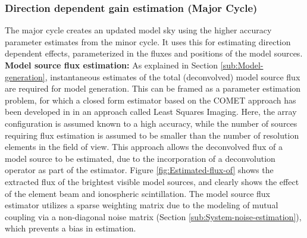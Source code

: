 \documentclass{aa}
\begin{document}
\subsubsection{\label{sub:Direction-dependent-gain}Direction dependent gain estimation
(Major Cycle)}  The major cycle  creates an updated  model sky using  the higher
accuracy parameter estimates  from the minor cycle. It  uses this for estimating
direction dependent  effects, parameterized in  the fluxes and positions  of the
model sources.\\
\textbf{Model source flux estimation:} As  explained in Section
\ref{sub:Model-generation}, instantaneous  estimates of the  total (deconvolved)
model source  flux are required for model  generation.  This can be  framed as a
parameter estimation  problem, for  which a closed  form estimator based  on the
COMET  approach has  been  developed in  \citep{wijnholds2008fundamental} in  an
approach called Least Squares Imaging.  Here, the array configuration is assumed
known to a high accuracy, while  the number of sources requiring flux estimation
is assumed to be smaller than the  number of resolution elements in the field of
view.   This approach  allows  the deconvolved  flux  of a  model  source to  be
estimated, due to  the incorporation of a deconvolution operator  as part of the
estimator. Figure  \ref{fig:Estimated-flux-of} shows  the extracted flux  of the
brightest visible  model sources,  and clearly shows  the effect of  the element
beam and ionospheric scintillation.  The  model source flux estimator utilizes a
sparse  weighting  matrix  due  to   the  modeling  of  mutual  coupling  via  a
non-diagonal  noise  matrix  (Section \ref{sub:System-noise-estimation}),  which
prevents a bias in estimation.
\end{document}
